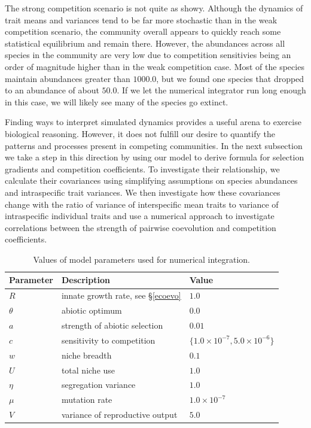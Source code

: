 \documentclass[]{elsarticle} %
\begin{document}
The strong competition scenario is not quite as showy. Although the
dynamics of trait means and variances tend to be far more stochastic
than in the weak competition scenario, the community overall appears to
quickly reach some statistical equilibrium and remain there. However,
the abundances across all species in the community are very low due to
competition sensitivies being an order of magnitude higher than in the
weak competition case. Most of the species maintain abundances greater
than \(1000.0\), but we found one species that dropped to an abundance
of about \(50.0\). If we let the numerical integrator run long enough in
this case, we will likely see many of the species go extinct.

Finding ways to interpret simulated dynamics provides a useful arena to
exercise biological reasoning. However, it does not fulfill our desire
to quantify the patterns and processes present in competing communities.
In the next subsection we take a step in this direction by using our
model to derive formula for selection gradients and competition
coefficients. To investigate their relationship, we calculate their
covariances using simplifying assumptions on species abundances and
intraspecific trait variances. We then investigate how these covariances
change with the ratio of variance of interspecific mean traits to
variance of intraspecific individual traits and use a numerical approach
to investigate correlations between the strength of pairwise coevolution
and competition coefficients.

\begin{table}
\centering\caption{Values of model parameters used for numerical integration.}\vspace{0.2cm}
\begin{tabular}{l|l|l}
Parameter     & Description & Value                                           \\ \hline
$R$         & innate growth rate, see \S\ref{ecoevo}  & $1.0$      \\
$\theta$    & abiotic optimum & $0.0$                              \\
$a$         & strength of abiotic selection & $0.01$               \\
$c$         & sensitivity to competition & $\{1.0\times10^{-7},5.0\times10^{-6}\}$ \\
$w$         & niche breadth & $0.1$                               \\
$U$         & total niche use & $1.0$                              \\
$\eta$      & segregation variance & $1.0$                         \\
$\mu$       & mutation rate & $1.0\times10^{-7}$                             \\
$V$ & variance of reproductive output & $5.0$
\end{tabular}\label{par_vals}
\end{table}
\end{document}
